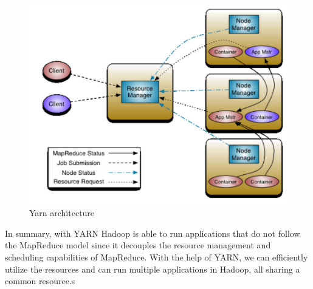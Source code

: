 \begin{figure}[H]
	\includegraphics[width=120mm, keepaspectratio]{figures/yarn.png}
	\centering
	\caption*{Yarn architecture}
	\centering
\end{figure}

In summary, with YARN Hadoop is able to run applications that do not follow the MapReduce model since it decouples the resource management and scheduling capabilities of MapReduce. With the help of YARN, we can efficiently utilize the resources and can run multiple applications in Hadoop, all sharing a common resource.s